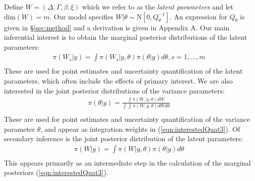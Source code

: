\documentclass[serif,10pt]{wiley-article}
\begin{document}
Define $W = \left(\Delta, \Gamma,\beta, \xi \right)$ which we refer to as the \textit{latent parameters} and let $\text{dim}(W) = m$. Our model specifies $W|\theta\sim\text{N}\left[ 0,Q^{-1}_{\theta}\right]$. An expression for $Q_{\theta}$ is given in \S\ref{sec:method} and a derivation is given in Appendix A. Our main inferential interest is to obtain the marginal posterior distributions of the latent parameters:
\begin{equation}\begin{aligned}\label{eqn:interestedQuat3}
\pi(W_{s}|y) = \int \pi(W_{s}|y,\theta) \pi(\theta|y) d\theta, s = 1,\ldots,m  \\
\end{aligned}\end{equation}
These are used for point estimates and uncertainty quantification of the latent parameters, which often include the effects of primary interest. We are also interested in the joint posterior distributions of the variance parameters:
\begin{equation}\begin{aligned}\label{eqn:interestedQuat1}
\pi(\theta|y) = \frac{\int \pi(W,y,\theta) dW}{\int_{} \int_{} \pi(W,y,\theta) dW d\theta } \\
\end{aligned}\end{equation}
These are used for point estimates and uncertainty quantification of the variance parameter $\theta$, and appear as integration weights in (\ref{eqn:interestedQuat3}). Of secondary inference is the joint posterior distribution of the latent parameters:
\begin{equation}\begin{aligned}\label{eqn:interestedQuat2}
\pi(W|y) = \int \pi(W|y,\theta) \pi(\theta|y) d\theta  \\
\end{aligned}\end{equation}
This appears primarily as an intermediate step in the calculation of the marginal posteriors (\ref{eqn:interestedQuat3}).
\end{document}
